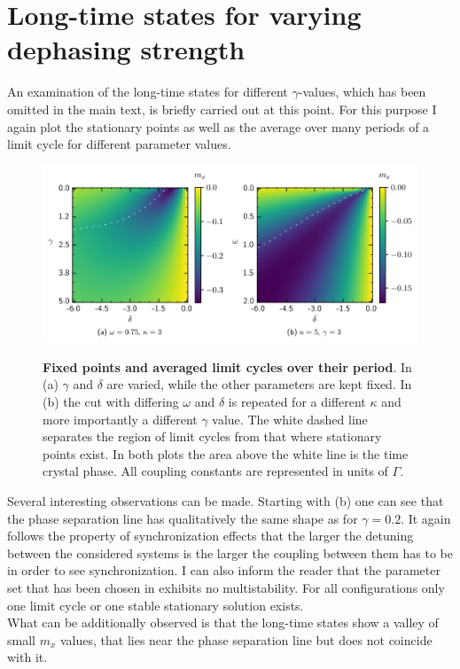     \section{Long-time states for varying dephasing strength}\label{app:gamma_analysis}
    An examination of the long-time states for different $\gamma$-values, which has been omitted in the main text, is briefly carried out at this point. For this purpose I again plot the stationary points as well as the average over many periods of a limit cycle for different parameter values.
    \begin{figure}[H]
        \centering
        \caption{\textbf{Fixed points and averaged limit cycles over their period}. In (a) $\gamma$ and $\delta$ are varied, while the other parameters are kept fixed. In (b) the cut with differing $\omega$ and $\delta$ is repeated for a different $\kappa$ and more importantly a different $\gamma$ value. The white dashed line separates the region of limit cycles from that where stationary points exist. In both plots the area above the white line is the time crystal phase. All coupling constants are represented in units of $\Gamma$.}
        \includegraphics{pictures/limit_cycle_mean_gw.png}
        \label{fig:gamma_longtime}
    \end{figure}
    Several interesting observations can be made. Starting with (b) one can see that the phase separation line has qualitatively the same shape as for $\gamma=0.2$. It again follows the property of synchronization effects that the larger the detuning between the considered systems is the larger the coupling between them has to be in order to see synchronization. I can also inform the reader that the parameter set that has been chosen in   exhibits no multistability. For all configurations only one limit cycle or one stable stationary solution exists. \\
    What can be additionally observed is that the long-time states show a valley of small $m_x$ values, that lies near the phase separation line but does not coincide with it. \\\\
